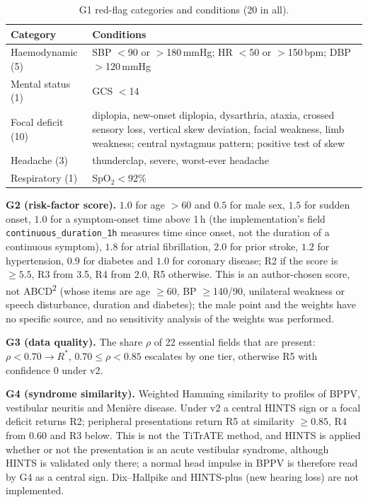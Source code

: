 \documentclass[11pt,a4paper]{article}%
\theoremstyle{plain}%
\theoremstyle{remark}%
\begin{document}
\begin{table}[h]
\caption{G1 red-flag categories and conditions (20 in all).}\label{tab:g1}
\small
\begin{tabular}{@{}p{}p{}@{}}
\toprule
Category & Conditions \\
\midrule
Haemodynamic (5) & SBP $<$90 or $>$180\,mmHg; HR $<$50 or $>$150\,bpm; DBP $>$120\,mmHg \\
Mental status (1) & GCS $<$14 \\
Focal deficit (10) & diplopia, new-onset diplopia, dysarthria, ataxia, crossed sensory loss, vertical skew deviation, facial weakness, limb weakness; central nystagmus pattern; positive test of skew \\
Headache (3) & thunderclap, severe, worst-ever headache \\
Respiratory (1) & SpO$_2<$92\% \\
\bottomrule
\end{tabular}
\end{table}

\textbf{G2 (risk-factor score).} $1.0$ for age $>60$ and $0.5$ for male sex, $1.5$ for sudden onset, $1.0$ for a symptom-onset time above 1\,h (the implementation's field \texttt{continuous\_duration\_1h} measures time since onset, not the duration of a continuous symptom), $1.8$ for atrial fibrillation, $2.0$ for prior stroke, $1.2$ for hypertension, $0.9$ for diabetes and $1.0$ for coronary disease; R2 if the score is $\ge5.5$, R3 from 3.5, R4 from 2.0, R5 otherwise. This is an author-chosen score, not ABCD\textsuperscript{2} (whose items are age $\ge$60, BP $\ge$140/90, unilateral weakness or speech disturbance, duration and diabetes); the male point and the weights have no specific source, and no sensitivity analysis of the weights was performed.

\textbf{G3 (data quality).} The share $\rho$ of 22 essential fields that are present: $\rho<0.70\to R^*$, $0.70\le\rho<0.85$ escalates by one tier, otherwise R5 with confidence 0 under v2.

\textbf{G4 (syndrome similarity).} Weighted Hamming similarity to profiles of BPPV, vestibular neuritis and Meni\`ere disease. Under v2 a central HINTS sign or a focal deficit returns R2; peripheral presentations return R5 at similarity $\ge0.85$, R4 from 0.60 and R3 below. This is not the TiTrATE method, and HINTS is applied whether or not the presentation is an acute vestibular syndrome, although HINTS is validated only there; a normal head impulse in BPPV is therefore read by G4 as a central sign. Dix--Hallpike and HINTS-plus (new hearing loss) are not implemented.
\end{document}
